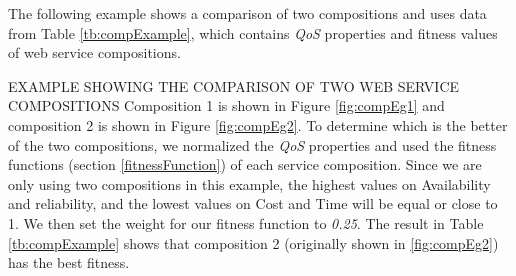 The following example shows a comparison of two compositions and uses data from Table \ref{tb:compExample}, which contains \emph{QoS} properties and fitness values of web service compositions. \\

\begin{example}
\noindent
EXAMPLE SHOWING THE COMPARISON OF TWO WEB SERVICE COMPOSITIONS
\setlength{\textfloatsep}{10pt}%
Composition 1 is shown in Figure \ref{fig:compEg1} and composition  2 is shown in Figure \ref{fig:compEg2}. To determine which is the better of the two compositions, we normalized the \emph{QoS} properties and used the fitness functions (section \ref{fitnessFunction}) of each service composition. Since we are only using two compositions in this example, the highest values on Availability and reliability, and the lowest values on Cost and Time will be equal or close to 1. We then set the weight for our fitness function to \emph{0.25}. The result in Table \ref{tb:compExample} shows that composition 2 (originally shown in \ref{fig:compEg2}) has the best fitness.  
\end{example}

\begin{table}[H]
\centering
\caption{Comparison of two web service compositions}
\label{tb:compExample}
\end{table}

